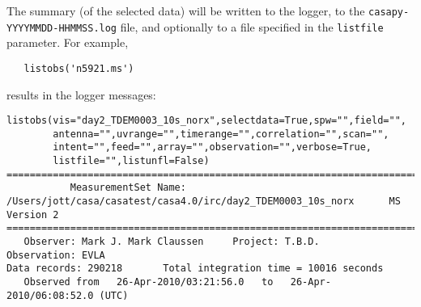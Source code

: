 The summary (of the selected data) will be written to the logger, to
the {\tt casapy-YYYYMMDD-HHMMSS.log} file, and optionally to a file
specified in the {\tt listfile} parameter.  For example, \small
\begin{verbatim}
   listobs('n5921.ms')
\end{verbatim}
\normalsize
results in the logger messages:
\footnotesize
\begin{verbatim}
listobs(vis="day2_TDEM0003_10s_norx",selectdata=True,spw="",field="",
        antenna="",uvrange="",timerange="",correlation="",scan="",
        intent="",feed="",array="",observation="",verbose=True,
        listfile="",listunfl=False)
================================================================================
           MeasurementSet Name:  /Users/jott/casa/casatest/casa4.0/irc/day2_TDEM0003_10s_norx      MS Version 2
================================================================================
   Observer: Mark J. Mark Claussen     Project: T.B.D.  
Observation: EVLA
Data records: 290218       Total integration time = 10016 seconds
   Observed from   26-Apr-2010/03:21:56.0   to   26-Apr-2010/06:08:52.0 (UTC)
   

\end{verbatim}
